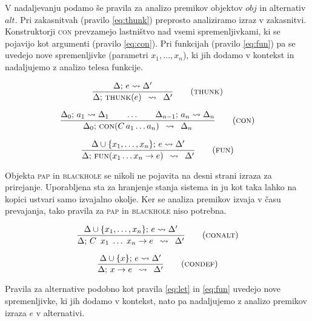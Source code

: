 V nadaljevanju podamo še pravila za analizo premikov objektov $obj$ in alternativ $alt$. Pri zakasnitvah (pravilo \ref{eq:thunk}) preprosto analiziramo izraz v zakasnitvi. Konstruktorji \textsc{con} prevzamejo lastništvo nad vsemi spremenljivkami, ki se pojavijo kot argumenti (pravilo \ref{eq:con}). Pri funkcijah (pravilo \ref{eq:fun}) pa se uvedejo nove spremenljivke (parametri $x_1, \dots, x_n$), ki jih dodamo v kontekst in nadaljujemo z analizo telesa funkcije.

\begin{equation}
\infers[thunk]{
    \Delta; \, e \leadsto \Delta'
}{
    \Delta; \, \textsc{thunk}(e)
}{
	\Delta'
}
\label{eq:thunk}
\end{equation}

\begin{equation}
\infers[con]{
    \Delta_0; \, a_1 \leadsto \Delta_1
    \qquad
    \dots
    \qquad
    \Delta_{n - 1}; \, a_n \leadsto \Delta_n
}{
    \Delta_0; \, \textsc{con}(C \, a_1 \dots a_n)
}{
	\Delta_n
}
\label{eq:con}
\end{equation}

\begin{equation}
\infers[fun]{
    \Delta \cup \{ x_1, \dots, x_n \}; \, e \leadsto \Delta'
}{
    \Delta; \, \textsc{fun}(x_1 \dots x_n \to e)
}{
	\Delta'
}
\label{eq:fun}
\end{equation}

Objekta \textsc{pap} in \textsc{blackhole} se nikoli ne pojavita na desni strani izraza za prirejanje. Uporabljena sta za hranjenje stanja sistema in ju kot taka lahko na kopici ustvari samo izvajalno okolje. Ker se analiza premikov izvaja v času prevajanja, tako pravila za \textsc{pap} in \textsc{blackhole} niso potrebna.

\begin{equation}
\infers[conalt]{
    \Delta \cup \{ x_1, \dots, x_n \}; \, e \leadsto \Delta'
}{
    \Delta; \, C \enspace x_1 \; \dots \; x_n \to e
}{
	\Delta'
}
\label{eq:conalt}
\end{equation}

\begin{equation}
\infers[condef]{
    \Delta \cup \{ x \}; \, e \leadsto \Delta'
}{
    \Delta; \, x \to e
}{
	\Delta'
}
\label{eq:condef}
\end{equation}

Pravila za alternative podobno kot pravila \ref{eq:let} in \ref{eq:fun} uvedejo nove spremenljivke, ki jih dodamo v kontekst, nato pa nadaljujemo z analizo premikov izraza $e$ v alternativi.

